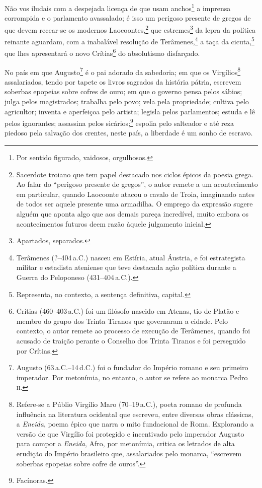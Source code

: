 Não vos iludais com a despejada licença de que usam anchos\footnote{
  Por sentido figurado, vaidosos, orgulhosos.} a imprensa corrompida e o
parlamento avassalado; é isso um perigoso presente de gregos de que
devem recear-se os modernos Laocoontes,\footnote{Sacerdote troiano que
  tem papel destacado nos ciclos épicos da poesia grega. Ao falar do
  ``perigoso presente de gregos'', o autor remete a um acontecimento em
  particular, quando Laocoonte atacou o cavalo de Troia, imaginando
  antes de todos ser aquele presente uma armadilha. O emprego da
  expressão sugere alguém que aponta algo que aos demais pareça
  incredível, muito embora os acontecimentos futuros deem razão àquele
  julgamento inicial.} que estremes\footnote{Apartados, separados.}
da lepra da política reinante aguardam, com a inabalável resolução de
Terâmenes,\footnote{Terâmenes (?--404\,a.C.) nasceu em Estíria, atual
  Áustria, e foi estrategista militar e estadista ateniense que teve destacada
  ação política durante a Guerra do Peloponeso (431--404\,a.C.).} a
taça da cicuta,\footnote{Representa, no contexto, a sentença
  definitiva, capital.} que lhes apresentará o novo Crítias\footnote{
  Crítias (460--403\,a.C.) foi um filósofo nascido em Atenas, tio de
  Platão e membro do grupo dos Trinta Tiranos que governaram a cidade.
  Pelo contexto, o autor remete ao processo de execução de Terâmenes,
  quando foi acusado de traição perante o Conselho dos Trinta Tiranos e
  foi perseguido por Crítias.} do absolutismo disfarçado.

No país em que Augusto\footnote{Augusto (63\,a.C.--14\,d.C.) foi o fundador
  do Império romano e seu primeiro imperador. Por metonímia, no entanto,
  o autor se refere ao monarca Pedro \textsc{ii}.} é o pai adorado da sabedoria;
em que os Virgílios\footnote{Refere-se a Públio Virgílio Maro (70--19\,a.C.), 
poeta romano de profunda influência na literatura
  ocidental que escreveu, entre diversas obras clássicas, a
  \emph{Eneida}, poema épico que narra o mito fundacional de Roma.
  Explorando a versão de que Virgílio foi protegido e incentivado pelo
  imperador Augusto para compor a \emph{Eneida},
  Afro, por metonímia, critica os letrados de alta erudição do
  Império brasileiro que, assalariados pelo monarca, ``escrevem soberbas
  epopeias sobre cofre de ouros''.} assalariados, tendo por tapete os
livros sagrados da história pátria, escrevem soberbas epopeias sobre
cofres de ouro; em que o governo pensa pelos sábios; julga pelos
magistrados; trabalha pelo povo; vela pela propriedade; cultiva pelo
agricultor; inventa e aperfeiçoa pelo artista; legisla pelos
parlamentos; estuda e lê pelos ignorantes; assassina pelos
sicários;\footnote{Facínoras.} espolia pelo salteador e até reza
piedoso pela salvação dos crentes, neste país, a liberdade é um sonho de
escravo.

